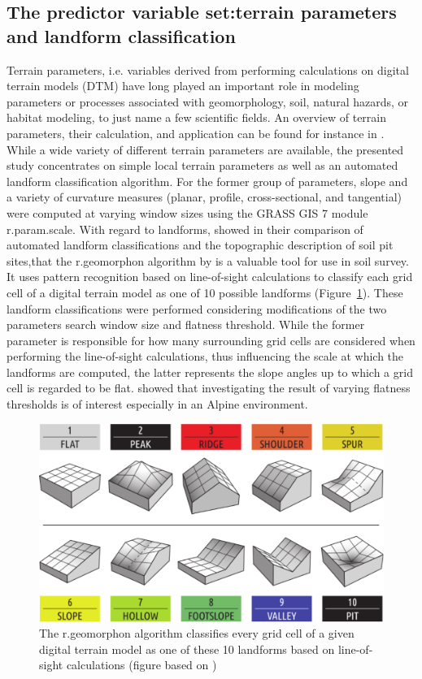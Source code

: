 \documentclass[soilsystems,article,submit,moreauthors,pdftex,10pt,a4paper]{Definitions/mdpi}
\begin{document}
\subsection{The predictor variable set:terrain parameters and landform classification}
Terrain parameters, i.e. variables derived from performing calculations on digital terrain models  (DTM) have long played an important role in modeling parameters or processes associated with geomorphology, soil, natural hazards, or habitat modeling, to just name a few scientific fields. An overview of terrain parameters, their calculation, and application can be found for instance in \cite{Gallant2000, Olaya2009}. While a wide variety of different terrain parameters are available, the presented study concentrates on simple local terrain parameters as well as an automated landform classification algorithm. For the former group of parameters, slope and a variety of curvature measures (planar, profile, cross-sectional, and tangential) were computed at varying window sizes using the GRASS GIS 7 \citep{GRASS} module r.param.scale. With regard to landforms,  \cite{Gruber2017} showed in their comparison of automated landform classifications and the topographic description of soil pit sites,that the r.geomorphon algorithm by \cite{Jasiewicz2013} is a valuable tool for use in soil survey. It uses pattern recognition based on line-of-sight calculations to classify each grid cell of a digital terrain model as one of 10 possible landforms (Figure~\ref{fig:geomorphonlegend}). These landform classifications were performed considering modifications of the two parameters search window size and flatness threshold. While the former parameter is responsible for how many surrounding grid cells are considered when performing the line-of-sight calculations, thus influencing the scale at which the landforms are computed, the latter represents the slope angles up to which a grid cell is regarded to be flat. \cite{Gruber2017} showed that investigating the result of varying flatness thresholds is of interest especially in an Alpine environment.
 \begin{figure}[ht!]
\includegraphics[width=\textwidth,angle=0]{legende_geomorphons_cropped.pdf}
\caption{The r.geomorphon algorithm  classifies every grid cell of a given digital terrain model as one of these 10 landforms based on line-of-sight calculations (figure based on \cite{Jasiewicz2013})}
\label{fig:geomorphonlegend}
\end{figure}
\end{document}

